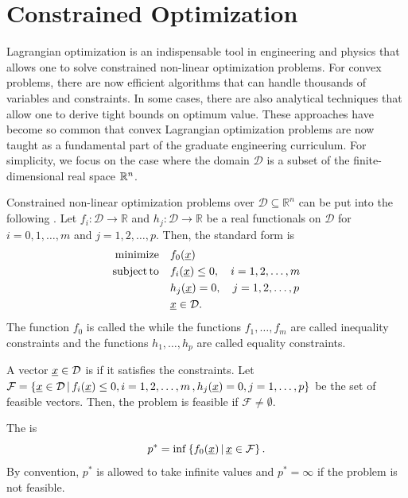 \section{Constrained Optimization}

Lagrangian optimization is an indispensable tool in engineering and physics that allows one to solve constrained non-linear optimization problems.
For convex problems, there are now efficient algorithms that can handle thousands of variables and constraints.
In some cases, there are also analytical techniques that allow one to derive tight bounds on optimum value.
These approaches have become so common that convex Lagrangian optimization problems are now taught as a fundamental part of the graduate engineering curriculum.
For simplicity, we focus on the case where the domain $\mathcal{D}$ is a subset of the finite-dimensional real space $\mathbb{R}^n$.

Constrained non-linear optimization problems over $\mathcal{D} \subseteq \mathbb{R}^n$ can be put into the following .
Let $f_i \colon \mathcal{D} \rightarrow \mathbb{R}$ and $h_j \colon \mathcal{D} \rightarrow \mathbb{R}$ be a real functionals on $\mathcal{D}$ for $i=0,1,\ldots,m$ and $j=1,2,\ldots,p$.
Then, the standard form is
\begin{align*}
\mathrm{minimize} \quad & f_0 (\underline{x}) \\
\mathrm{subject\,to} \quad & f_i (\underline{x}) \leq 0, \quad i=1,2,\ldots,m \\
& h_j (\underline{x}) = 0, \quad j=1,2,\ldots,p \\
& \underline{x} \in \mathcal{D}.
\end{align*}
The function $f_0$ is called the  while the functions $f_1,\ldots,f_m$ are called inequality constraints and the functions $h_1,\ldots,h_p$ are called equality constraints.

\begin{definition}
A vector $\underline{x} \in \mathcal{D}$ is  if it satisfies the constraints.
Let $\mathcal{F} = \{ \underline{x} \in \mathcal{D} \, | \,  f_i (\underline{x}) \leq 0, i=1,2,\ldots,m \, , h_j (\underline{x}) = 0, j=1,\ldots,p \}$ be the set of feasible vectors.
Then, the problem is feasible if $\mathcal{F} \neq \emptyset$.
\end{definition}

\begin{definition}
The  is
\[ p^* = \inf \left\{ f_0 (\underline{x}) \, | \, \underline{x} \in \mathcal{F} \right\}. \]
By convention, $p^*$ is allowed to take infinite values and $p^* = \infty$ if the problem is not feasible.
\end{definition}


